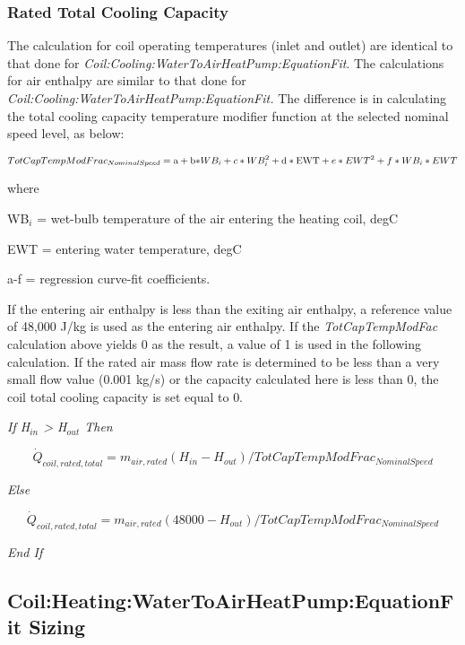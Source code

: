 \subsubsection{Rated Total Cooling Capacity}\label{rated-total-cooling-capacity-1}

The calculation for coil operating temperatures (inlet and outlet) are identical to that done for \emph{Coil:Cooling:WaterToAirHeatPump:EquationFit}. The calculations for air enthalpy are similar to that done for \emph{Coil:Cooling:WaterToAirHeatPump:EquationFit.} The difference is in calculating the total cooling capacity temperature modifier function at the selected nominal speed level, as below:

\begin{equation}
TotCapTempModFra{c_{NominalSpeed}} = {\rm{a}} + {\rm{b*}}W{B_i} + c*WB_i^2 + {\rm{d*EWT}} + e*EW{T^2} + f*W{B_i}*EWT
\end{equation}

where

WB\(_{i}\) = wet-bulb temperature of the air entering the heating coil, degC

EWT = entering water temperature, degC

a-f = regression curve-fit coefficients.

If the entering air enthalpy is less than the exiting air enthalpy, a reference value of 48,000 J/kg is used as the entering air enthalpy. If the \emph{TotCapTempModFac} calculation above yields 0 as the result, a value of 1 is used in the following calculation. If the rated air mass flow rate is determined to be less than a very small flow value (0.001 kg/s) or the capacity calculated here is less than 0, the coil total cooling capacity is set equal to 0.

\emph{If H\(_{in}\) \textgreater{} H\(_{out}\) Then}

\begin{equation}
{\dot Q_{coil,rated,total}} = {m_{air,rated}}({H_{in}} - {H_{out}})/TotCapTempModFra{c_{NominalSpeed}}
\end{equation}

\emph{Else}

\begin{equation}
{\dot Q_{coil,rated,total}} = {m_{air,rated}}(48000 - {H_{out}})/TotCapTempModFra{c_{NominalSpeed}}
\end{equation}

\emph{End If}

\subsection{Coil:Heating:WaterToAirHeatPump:EquationFit Sizing}\label{coilheatingwatertoairheatpumpequationfit-sizing}

